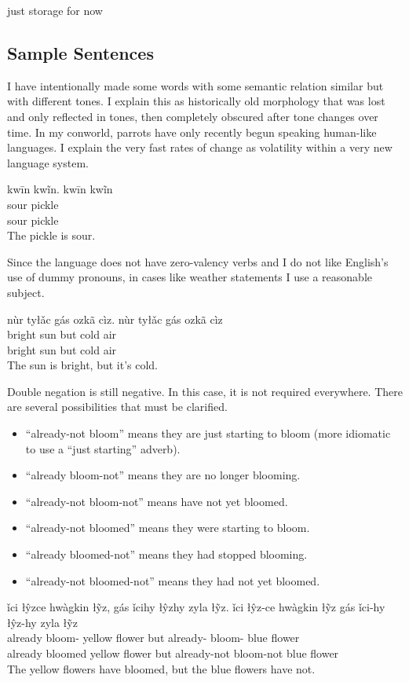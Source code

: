 just storage for now


\subsection{Sample Sentences}\label{subsec:sample-sentences}

I have intentionally made some words with
some semantic relation similar but with different tones.
I explain this as historically old morphology
that was lost and only reflected in tones,
then completely obscured after tone changes over time.
In my conworld, parrots have only recently begun
speaking human-like languages.
I explain the very fast rates of change
as volatility within a very new language system.

\begin{exe}
    \ex
    kwīn kwĩn.
    \glll
    kwīn kwĩn \\
    sour pickle \\
    sour pickle \\
    \glt
    The pickle is sour.
\end{exe}

Since the language does not have zero-valency verbs
and I do not like English's use of dummy pronouns,
in cases like weather statements
I use a reasonable subject.

\begin{exe}
    \ex
    nùr tyłǎc gás ozkã cìz.
    \glll
    nùr tyłǎc gás ozkã cìz \\
    bright sun but cold air \\
    bright sun but cold air \\
    \glt
    The sun is bright, but it's cold.
\end{exe}

Double negation is still negative.
In this case, it is not required everywhere.
There are several possibilities that must be clarified.
\begin{itemize}
    \item ``already-not bloom'' means they are just starting to bloom
    (more idiomatic to use a ``just starting'' adverb).
    \item ``already bloom-not'' means they are no longer blooming.
    \item ``already-not bloom-not'' means have not yet bloomed.
    \item ``already-not bloomed'' means they were starting to bloom.
    \item ``already bloomed-not'' means they had stopped blooming.
    \item ``already-not bloomed-not'' means they had not yet bloomed.
\end{itemize}
\begin{exe}
    \ex
    ǐci łŷzce hwàgkin łỹz, gás ǐcihy łŷzhy zyla łỹz.
    \glll
    ǐci łŷz-ce hwàgkin łỹz gás ǐci-hy łŷz-hy zyla łỹz \\
    already bloom-\Pst{} yellow flower but already-\Neg{} bloom-\Neg{} blue flower \\
    already bloomed yellow flower but already-not bloom-not blue flower \\
    \glt
    The yellow flowers have bloomed, but the blue flowers have not.
\end{exe}

